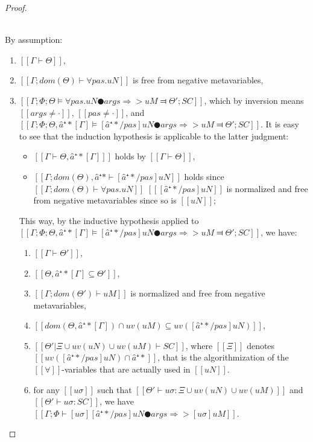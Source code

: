 \begin{proof}
\begin{caseof}
        \item {}\\
            By assumption:
            \begin{enumerate}
                \item $[[Γ ⊢ Θ]]$,
                \item $[[Γ; dom(Θ) ⊢  ∀pas.uN]]$ is free from negative metavariables,
                \item $[[Γ; Φ; Θ ⊨ ∀pas.uN ● args ⇒> uM ⫤ Θ'; SC]]$, which by inversion means
                    $[[args ≠ ·]]$, $[[pas ≠ ·]]$, and $[[Γ; Φ; Θ, â⁺*[Γ] ⊨ [â⁺*/pas]uN ● args ⇒> uM ⫤ Θ'; SC]]$.
                    It is easy to see that the induction hypothesis is applicable to the latter judgment:
                    \begin{itemize}
                        \item $[[Γ ⊢ Θ, â⁺*[Γ] ]]$ holds by $[[Γ ⊢ Θ]]$, 
                        \item $[[Γ; dom(Θ), â⁺* ⊢ [â⁺*/pas]uN]]$
                            holds since $[[Γ; dom(Θ) ⊢ ∀pas.uN]]$
                            $[[ [â⁺*/pas]uN ]]$ is normalized and free from negative metavariables
                            since so is $[[uN]]$;
                    \end{itemize}
                    This way, by the inductive hypothesis applied to 
                    $[[Γ; Φ; Θ, â⁺*[Γ] ⊨ [â⁺*/pas]uN ● args ⇒> uM ⫤ Θ'; SC]]$,
                    we have:
                    \begin{enumerate}
                        \item $[[Γ ⊢ Θ']]$,
                        \item $[[Θ, â⁺*[Γ] ⊆ Θ']]$,
                        \item $[[Γ; dom(Θ') ⊢ uM]]$ is normalized and free from negative metavariables,
                        \item $[[dom(Θ, â⁺*[Γ]) ∩ uv(uM) ⊆ uv([â⁺*/pas]uN)]]$,
                        \item $[[Θ'|Ξ ∪ uv(uN) ∪ uv(uM) ⊢ SC]]$, where $[[Ξ]]$ denotes $[[uv([â⁺*/pas]uN) ∩ {â⁺*}]]$,
                            that is the algorithmization of the $[[∀]]$-variables that are actually used in $[[uN]]$.
                        \item  \label{typing-soundness:forall-ih}
                            for any 
                            $[[uσ]]$ such that 
                            $[[Θ' ⊢ uσ : Ξ ∪ uv(uN) ∪ uv(uM)]]$ and $[[ Θ' ⊢ uσ : SC ]]$, 
                            we have $[[ Γ ; Φ ⊢ [uσ][â⁺*/pas]uN ● args ⇒> [uσ]uM ]]$.
                    \end{enumerate}
            \end{enumerate}


\end{caseof}
\end{proof}
